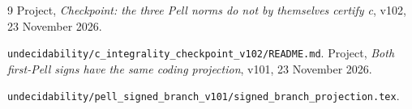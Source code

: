 \documentclass[11pt]{article}
\begin{document}
\begin{thebibliography}{9}
\small
{} Project, \emph{Checkpoint: the three Pell norms
do not by themselves certify c}, v102, 23 November 2026.
\par\nolinkurl{undecidability/c_integrality_checkpoint_v102/README.md}.
 Project, \emph{Both first-Pell signs have the same
coding projection}, v101, 23 November 2026.
\par\nolinkurl{undecidability/pell_signed_branch_v101/signed_branch_projection.tex}.
\end{thebibliography}
\end{document}
